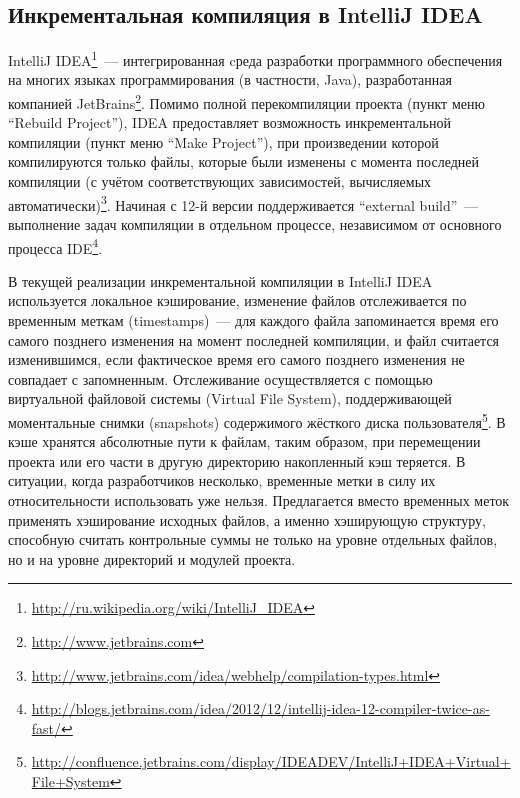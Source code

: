 \subsection{Инкрементальная компиляция в IntelliJ IDEA}
IntelliJ IDEA\footnote{\url{http://ru.wikipedia.org/wiki/IntelliJ_IDEA}}~--- интегрированная cреда разработки программного обеспечения на многих языках программирования (в частности, Java), разработанная компанией JetBrains\footnote{\url{http://www.jetbrains.com}}. Помимо полной перекомпиляции проекта (пункт меню ``Rebuild Project''), IDEA предоставляет возможность инкрементальной компиляции (пункт меню ``Make Project''), при произведении которой компилируются только файлы, которые были изменены с момента последней компиляции (с учётом соответствующих зависимостей, вычисляемых автоматически)\footnote{\url{http://www.jetbrains.com/idea/webhelp/compilation-types.html}}. Начиная с 12-й версии поддерживается ``external build''~--- выполнение задач компиляции в отдельном процессе, независимом от основного процесса IDE\footnote{\url{http://blogs.jetbrains.com/idea/2012/12/intellij-idea-12-compiler-twice-as-fast/}}.

В текущей реализации инкрементальной компиляции в IntelliJ IDEA используется локальное кэширование, изменение файлов отслеживается по временным меткам (timestamps)~--- для каждого файла запоминается время его самого позднего изменения на момент последней компиляции, и файл считается изменившимся, если фактическое время его самого позднего изменения не совпадает с запомненным. Отслеживание осуществляется с помощью виртуальной файловой системы (Virtual File System), поддерживающей моментальные снимки (snapshots) содержимого жёсткого диска пользователя\footnote{\url{http://confluence.jetbrains.com/display/IDEADEV/IntelliJ+IDEA+Virtual+File+System}}. В кэше хранятся абсолютные пути к файлам, таким образом, при перемещении проекта или его части в другую директорию накопленный кэш теряется. В ситуации, когда разработчиков несколько, временные метки в силу их относительности использовать уже нельзя. Предлагается вместо временных меток применять хэширование исходных файлов, а именно хэширующую структуру, способную считать контрольные суммы не только на уровне отдельных файлов, но и на уровне директорий и модулей проекта.

